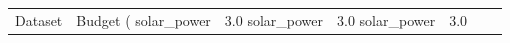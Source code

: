 \begin{tabular}{llrlrrr}
\toprule
Dataset & Budget (%
\midrule
solar_power & 3.0%
solar_power & 3.0%
solar_power & 3.0%
\bottomrule
\end{tabular}
